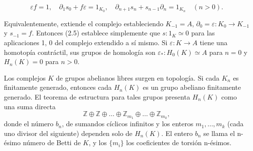 \[ \varepsilon f = 1, \quad \partial_{1} s_0 + f \varepsilon = 1_{K_0}, \quad \partial_{n+1} s_n + s_{n-1} \partial_n = 1_{K_n} \quad (n > 0). \]

Equivalentemente, extiende el complejo estableciendo \( K_{-1} = A \), \( \partial_0 = \varepsilon: K_0 \to K_{-1} \) y \( s_{-1} = f \). Entonces (2.5) establece simplemente que \( s: 1_K \simeq 0 \) para las aplicaciones 1, 0 del complejo extendido a sí mismo. Si \( \varepsilon: K \to A \) tiene una homotopía contráctil, sus grupos de homología son \( \varepsilon_*: H_0(K) \simeq A \) para \( n = 0 \) y \( H_n(K) = 0 \) para \( n > 0 \).

Los complejos \( K \) de grupos abelianos libres surgen en topología. Si cada \( K_n \) es finitamente generado, entonces cada \( H_n(K) \) es un grupo abeliano finitamente generado. El teorema de estructura para tales grupos presenta \( H_n(K) \) como una suma directa
\[ \mathbb{Z} \oplus \mathbb{Z} \oplus \ldots \oplus \mathbb{Z}_{m_1} \oplus \ldots \oplus \mathbb{Z}_{m_k}, \]
donde el número \( b_n \), de sumandos cíclicos infinitos y los enteros \( m_1, \ldots, m_k \) (cada uno divisor del siguiente) dependen solo de \( H_n(K) \). El entero \( b_n \) se llama el n-ésimo número de Betti de \( K \), y los \( \{m_i\} \) los coeficientes de torsión n-ésimos.


\endinput
